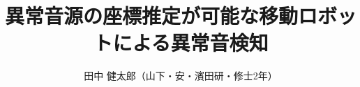 \documentclass{/workdir/classes/minithesis2024j}
\begin{document}
\title{異常音源の座標推定が可能な移動ロボットによる異常音検知}
\author{田中 健太郎（山下・安・濱田研・修士2年）}

\setlength{\baselineskip}{4.4mm}

\maketitle

\thispagestyle{empty}
\pagestyle{empty}









\end{document}

